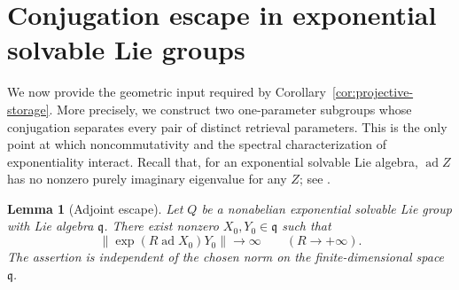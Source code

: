 \documentclass[reqno]{amsart}
\numberwithin{equation}{section}
\newtheorem{lemma}[theorem]{Lemma}
\theoremstyle{definition}
\theoremstyle{remark}
\newcommand{\ad}{\operatorname{ad}}
\begin{document}
\section{Conjugation escape in exponential solvable Lie groups}
\label{sec:geometry}

We now provide the geometric input required by
Corollary~\ref{cor:projective-storage}.  More precisely, we construct two
one-parameter subgroups whose conjugation separates every pair of distinct
retrieval parameters.  This is the only point at which noncommutativity and
the spectral characterization of exponentiality interact.  Recall that, for
an exponential solvable Lie algebra, $\ad Z$ has no nonzero purely imaginary
eigenvalue for any $Z$; see
\cite[Chapter~1, Theorem~1]{LeptinLudwig1994}.

\begin{lemma}[Adjoint escape]\label{lem:lie-escape}
Let $Q$ be a nonabelian exponential solvable Lie group with Lie algebra
$\mathfrak q$.  There exist nonzero $X_0,Y_0\in\mathfrak q$ such that
\begin{equation}\label{eq:ad-escape}
 \|\exp(R\ad X_0)Y_0\|\longrightarrow\infty
 \qquad(R\to+\infty).
\end{equation}
The assertion is independent of the chosen norm on the finite-dimensional
space $\mathfrak q$.
\end{lemma}
\end{document}
